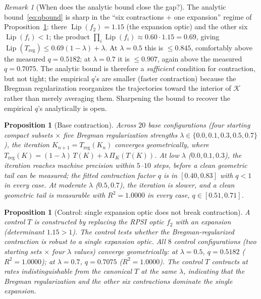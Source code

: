 \documentclass[11pt,a4paper]{article}
\theoremstyle{plain}
\newtheorem{proposition}[theorem]{Proposition}
\theoremstyle{definition}
\theoremstyle{remark}
\newtheorem{remark}[theorem]{Remark}
\DeclareMathOperator{\Lip}{Lip}
\begin{document}
\begin{remark}[When does the analytic bound close the gap?]
\label{rem:qbound-tightness}
The analytic bound~\eqref{eq:qbound} is sharp in the
``six contractions + one expansion'' regime of
Proposition~\ref{prop:titer-control}: there $\Lip(f_2) = 1.15$
(the expansion optic) and the other six $\Lip(f_i) < 1$; the product
$\prod_i \Lip(f_i) \approx 0.60 \cdot 1.15 = 0.69$, giving
$\Lip(T_{\mathrm{reg}}) \leq 0.69(1-\lambda) + \lambda$. At
$\lambda = 0.5$ this is $\leq 0.845$, comfortably above the measured
$q = 0.5182$; at $\lambda = 0.7$ it is $\leq 0.907$, again above the
measured $q = 0.7075$. The analytic bound is therefore a
\emph{sufficient} condition for contraction, but not tight; the
empirical $q$'s are smaller (faster contraction) because the
Bregman regularization reorganizes the trajectories toward the
interior of $\mathcal K$ rather than merely averaging them. Sharpening
the bound to recover the empirical $q$'s analytically is open.
\end{remark}

\begin{proposition}[Base contraction]\label{prop:titer-base}
Across $20$ base configurations (four starting compact subsets $\times$
five Bregman regularization strengths $\lambda\in\{0.0, 0.1, 0.3, 0.5,
0.7\}$), the iteration $K_{n+1} = T_{\mathrm{reg}}(K_n)$ converges
geometrically, where $T_{\mathrm{reg}}(K) = (1-\lambda)\,T(K) +
\lambda\,\Pi_K(T(K))$. At low $\lambda$ ($0.0, 0.1, 0.3$), the iteration
reaches machine precision within $5$--$10$ steps, before a clean
geometric tail can be measured; the fitted contraction factor $q$ is
in $[0.40, 0.83]$ with $q<1$ in every case. At moderate $\lambda$
($0.5, 0.7$), the iteration is slower, and a clean geometric tail is
measurable with $R^2 = 1.0000$ in every case, $q \in [0.51, 0.71]$.
\end{proposition}

\begin{proposition}[Control: single expansion optic does not break
contraction]\label{prop:titer-control}
A control $T$ is constructed by replacing the RPSI optic $f_2$ with an
expansion (determinant $1.15 > 1$). The control tests whether the
Bregman-regularized contraction is robust to a single expansion optic.
All $8$ control configurations (two starting sets $\times$ four
$\lambda$ values) converge geometrically: at $\lambda=0.5$,
$q = 0.5182$ ($R^2 = 1.0000$); at $\lambda = 0.7$, $q = 0.7075$
($R^2 = 1.0000$). The control $T$ contracts at rates indistinguishable
from the canonical $T$ at the same $\lambda$, indicating that the
Bregman regularization and the other six contractions dominate the
single expansion.
\end{proposition}
\end{document}

